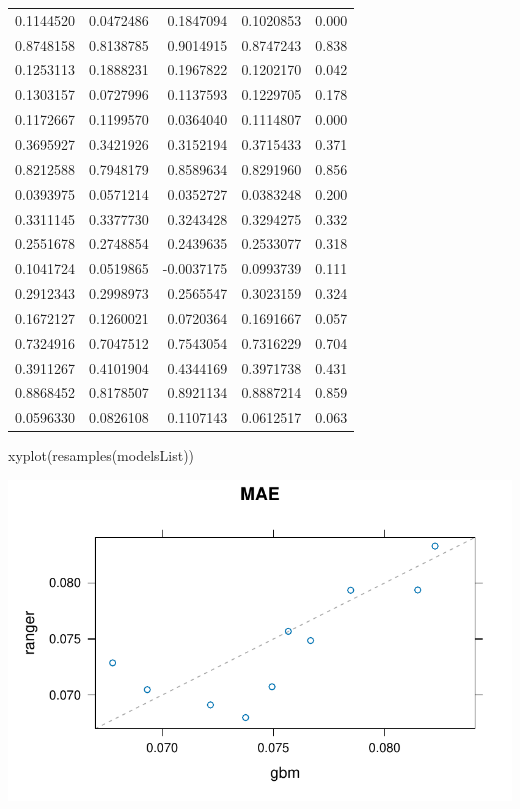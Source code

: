 \documentclass[
  letterpaper,
  DIV=11,
  numbers=noendperiod]{scrartcl}
\newenvironment{Shaded}{\begin{snugshade}}{\end{snugshade}}
\newcommand{\FunctionTok}[1]{\textcolor[rgb]{0.28,0.35,0.67}{#1}}
\newcommand{\NormalTok}[1]{\textcolor[rgb]{0.00,0.23,0.31}{#1}}
\begin{document}
\begin{longtable}[]{@{}rrrrr@{}}
0.1144520 & 0.0472486 & 0.1847094 & 0.1020853 & 0.000 \\
0.8748158 & 0.8138785 & 0.9014915 & 0.8747243 & 0.838 \\
0.1253113 & 0.1888231 & 0.1967822 & 0.1202170 & 0.042 \\
0.1303157 & 0.0727996 & 0.1137593 & 0.1229705 & 0.178 \\
0.1172667 & 0.1199570 & 0.0364040 & 0.1114807 & 0.000 \\
0.3695927 & 0.3421926 & 0.3152194 & 0.3715433 & 0.371 \\
0.8212588 & 0.7948179 & 0.8589634 & 0.8291960 & 0.856 \\
0.0393975 & 0.0571214 & 0.0352727 & 0.0383248 & 0.200 \\
0.3311145 & 0.3377730 & 0.3243428 & 0.3294275 & 0.332 \\
0.2551678 & 0.2748854 & 0.2439635 & 0.2533077 & 0.318 \\
0.1041724 & 0.0519865 & -0.0037175 & 0.0993739 & 0.111 \\
0.2912343 & 0.2998973 & 0.2565547 & 0.3023159 & 0.324 \\
0.1672127 & 0.1260021 & 0.0720364 & 0.1691667 & 0.057 \\
0.7324916 & 0.7047512 & 0.7543054 & 0.7316229 & 0.704 \\
0.3911267 & 0.4101904 & 0.4344169 & 0.3971738 & 0.431 \\
0.8868452 & 0.8178507 & 0.8921134 & 0.8887214 & 0.859 \\
0.0596330 & 0.0826108 & 0.1107143 & 0.0612517 & 0.063 \\
\end{longtable}

\begin{Shaded}
\begin{Highlighting}[]
\FunctionTok{xyplot}\NormalTok{(}\FunctionTok{resamples}\NormalTok{(modelsList))}
\end{Highlighting}
\end{Shaded}

\includegraphics{MachineLearning_StaticPatterNN_Report_files/figure-pdf/ensemble-model-1.pdf}
\end{document}
